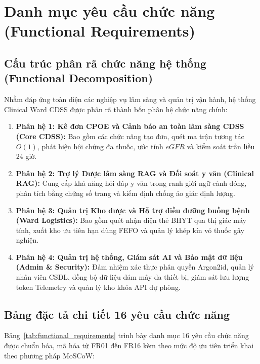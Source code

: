 \section{Danh mục yêu cầu chức năng (Functional Requirements)}
\label{sec:functional_requirements}

\subsection{Cấu trúc phân rã chức năng hệ thống (Functional Decomposition)}
\label{subsec:functional_decomposition}

Nhằm đáp ứng toàn diện các nghiệp vụ lâm sàng và quản trị vận hành, hệ thống Clinical Ward CDSS được phân rã thành bốn phân hệ chức năng chính:

\begin{enumerate}[leftmargin=1.8em]
    \item \textbf{Phân hệ 1: Kê đơn CPOE và Cảnh báo an toàn lâm sàng CDSS (Core CDSS):} Bao gồm các chức năng tạo đơn, quét ma trận tương tác $O(1)$, phát hiện hội chứng đa thuốc, ước tính $eGFR$ và kiểm soát trần liều 24 giờ.
    \item \textbf{Phân hệ 2: Trợ lý Dược lâm sàng RAG và Đối soát y văn (Clinical RAG):} Cung cấp khả năng hỏi đáp y văn trong ranh giới ngữ cảnh đóng, phân tích bằng chứng số trang và kiểm định chống ảo giác định lượng.
    \item \textbf{Phân hệ 3: Quản trị Kho dược và Hỗ trợ điều dưỡng buồng bệnh (Ward Logistics):} Bao gồm quét nhận diện thẻ BHYT qua thị giác máy tính, xuất kho ưu tiên hạn dùng FEFO và quản lý khép kín vỏ thuốc gây nghiện.
    \item \textbf{Phân hệ 4: Quản trị hệ thống, Giám sát AI và Bảo mật dữ liệu (Admin \& Security):} Đảm nhiệm xác thực phân quyền Argon2id, quản lý nhân viên CSDL, đồng bộ dữ liệu đám mây đa thiết bị, giám sát lưu lượng token Telemetry và quản lý kho khóa API dự phòng.
\end{enumerate}

\subsection{Bảng đặc tả chi tiết 16 yêu cầu chức năng}
\label{subsec:functional_requirements_table}

Bảng~\ref{tab:functional_requirements} trình bày danh mục 16 yêu cầu chức năng được chuẩn hóa, mã hóa từ FR01 đến FR16 kèm theo mức độ ưu tiên triển khai theo phương pháp MoSCoW:

